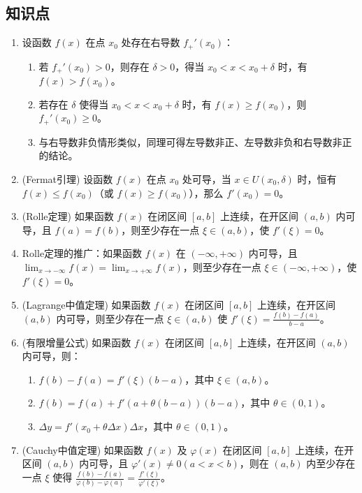\documentclass[UTF8]{ctexart}
\theoremstyle{remark}
\begin{document}
	\subsection*{知识点}
	\begin{enumerate}
		\item 设函数 \(f(x)\) 在点 \(x_{0}\) 处存在右导数 \(f_{+}'(x_{0})\)：
		\begin{enumerate}
			\item 若 \(f_{+}'(x_{0})>0\)，则存在 \(\delta>0\)，得当 \(x_{0}<x<x_{0}+\delta\) 时，有 \(f(x)>f(x_{0})\)。
			\item 若存在 \(\delta\) 使得当 \(x_{0}<x<x_{0}+\delta\) 时，有 \(f(x) \geq f(x_{0})\)，则 \(f_{+}'(x_{0}) \geq 0\)。
			\item 与右导数非负情形类似，同理可得左导数非正、左导数非负和右导数非正的结论。
		\end{enumerate}
		
		\item (Fermat引理) 设函数 $f(x)$ 在点 $x_{0}$ 处可导，当 $x \in U(x_{0}, \delta)$ 时，恒有 $f(x) \leqslant f(x_{0})$（或 $f(x) \geq f(x_{0})$），那么 $f'(x_{0})=0$。
		
		\item (Rolle定理) 如果函数 $f(x)$ 在闭区间 $[a, b]$ 上连续，在开区间 $(a, b)$ 内可导，且 $f(a)=f(b)$，则至少存在一点 $\xi \in(a, b)$，使 $f'(\xi)=0$。
		
		\item Rolle定理的推广：如果函数 $f(x)$ 在 $(-\infty,+\infty)$ 内可导，且 $\lim _{x \to -\infty} f(x)=\lim _{x \to +\infty} f(x)$，则至少存在一点 $\xi \in(-\infty,+\infty)$，使 $f'(\xi)=0$。
		
		\item (Lagrange中值定理) 如果函数 $f(x)$ 在闭区间 $[a, b]$ 上连续，在开区间 $(a, b)$ 内可导，则至少存在一点 $\xi \in(a, b)$ 使 $f'(\xi)=\frac{f(b)-f(a)}{b-a}$。
		
		\item (有限增量公式) 如果函数 $f(x)$ 在闭区间 $[a, b]$ 上连续，在开区间 $(a, b)$ 内可导，则：
		\begin{enumerate}
			\item $f(b)-f(a)=f'(\xi)(b-a)$，其中 $\xi \in(a, b)$。
			\item $f(b)=f(a)+f'(a+\theta(b-a))(b-a)$，其中 $\theta \in(0,1)$。
			\item $\Delta y=f'(x_{0}+\theta \Delta x) \Delta x$，其中 $\theta \in(0,1)$。
		\end{enumerate}
		
		\item (Cauchy中值定理) 如果函数 $f(x)$ 及 $\varphi(x)$ 在闭区间 $[a, b]$ 上连续，在开区间 $(a, b)$ 内可导，且 $\varphi'(x) \neq 0(a<x<b)$，则在 $(a, b)$ 内至少存在一点 $\xi$ 使得 $\frac{f(b)-f(a)}{\varphi(b)-\varphi(a)}=\frac{f'(\xi)}{\varphi'(\xi)}$。
		

\end{enumerate}
\end{document}
